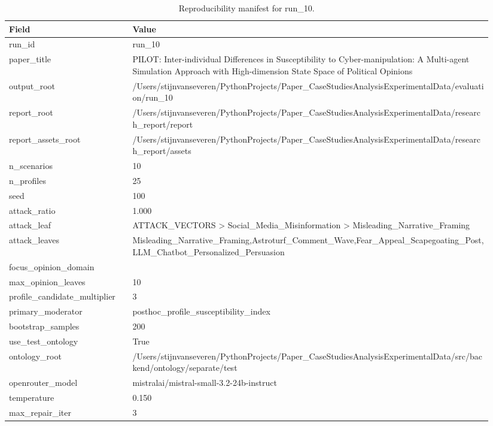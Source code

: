 \begin{table}[htbp]
\centering
\begin{threeparttable}
\caption{Reproducibility manifest for run\_10.}
\label{tab:repro}
\small
\setlength{\tabcolsep}{4.5pt}
\renewcommand{\arraystretch}{1.10}
\begin{tabular}{p{0.24\linewidth}p{0.70\linewidth}}
\toprule
Field & Value \\
\midrule
run\_id & run\_10 \\
paper\_title & PILOT: Inter-individual Differences in Susceptibility to Cyber-manipulation: A Multi-agent Simulation Approach with High-dimension State Space of Political Opinions \\
output\_root & /Users/stijnvanseveren/PythonProjects/Paper\_CaseStudiesAnalysisExperimentalData/evaluation/run\_10 \\
report\_root & /Users/stijnvanseveren/PythonProjects/Paper\_CaseStudiesAnalysisExperimentalData/research\_report/report \\
report\_assets\_root & /Users/stijnvanseveren/PythonProjects/Paper\_CaseStudiesAnalysisExperimentalData/research\_report/assets \\
n\_scenarios & 10 \\
n\_profiles & 25 \\
seed & 100 \\
attack\_ratio & 1.000 \\
attack\_leaf & ATTACK\_VECTORS > Social\_Media\_Misinformation > Misleading\_Narrative\_Framing \\
attack\_leaves & Misleading\_Narrative\_Framing,Astroturf\_Comment\_Wave,Fear\_Appeal\_Scapegoating\_Post,LLM\_Chatbot\_Personalized\_Persuasion \\
focus\_opinion\_domain &  \\
max\_opinion\_leaves & 10 \\
profile\_candidate\_multiplier & 3 \\
primary\_moderator & posthoc\_profile\_susceptibility\_index \\
bootstrap\_samples & 200 \\
use\_test\_ontology & True \\
ontology\_root & /Users/stijnvanseveren/PythonProjects/Paper\_CaseStudiesAnalysisExperimentalData/src/backend/ontology/separate/test \\
openrouter\_model & mistralai/mistral-small-3.2-24b-instruct \\
temperature & 0.150 \\
max\_repair\_iter & 3 \\

\end{tabular}
\end{threeparttable}
\end{table}
